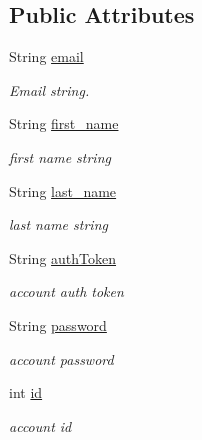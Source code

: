 \subsection*{Public Attributes}
\begin{DoxyCompactItemize}
\item 
String \hyperlink{classuk_1_1ac_1_1swan_1_1digitaltrails_1_1components_1_1_account_abd57b618dc4da21e752c066057b4d58a}{email}
\begin{DoxyCompactList}\small\item\em Email string. \end{DoxyCompactList}\item 
String \hyperlink{classuk_1_1ac_1_1swan_1_1digitaltrails_1_1components_1_1_account_a358d1327772c4154bac4cfaa1b3df8b4}{first\+\_\+name}
\begin{DoxyCompactList}\small\item\em first name string \end{DoxyCompactList}\item 
String \hyperlink{classuk_1_1ac_1_1swan_1_1digitaltrails_1_1components_1_1_account_a30eb77af35d518d869fb6cae590151e0}{last\+\_\+name}
\begin{DoxyCompactList}\small\item\em last name string \end{DoxyCompactList}\item 
String \hyperlink{classuk_1_1ac_1_1swan_1_1digitaltrails_1_1components_1_1_account_a608621dcce2a26a28bf7cff4898700a7}{auth\+Token}
\begin{DoxyCompactList}\small\item\em account auth token \end{DoxyCompactList}\item 
String \hyperlink{classuk_1_1ac_1_1swan_1_1digitaltrails_1_1components_1_1_account_a7a421a5b7ed69b2841fc0054e807f01f}{password}
\begin{DoxyCompactList}\small\item\em account password \end{DoxyCompactList}\item 
int \hyperlink{classuk_1_1ac_1_1swan_1_1digitaltrails_1_1components_1_1_account_aebe5ad9be12a09ad6d182cabaf964862}{id}
\begin{DoxyCompactList}\small\item\em account id \end{DoxyCompactList}\end{DoxyCompactItemize}

